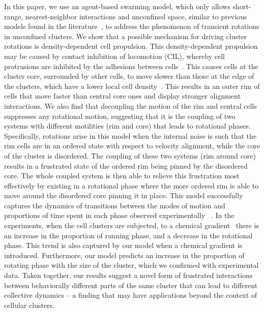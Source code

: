 \documentclass{article}
\begin{document}
In this paper, we use an agent-based swarming model, which only allows short-range, nearest-neighbor interactions and unconfined space, similar to previous models found in the literature~\cite{Couzin2005,Belmonte2008,Copenhagen2016a}, to address the phenomenon of transient rotations in unconfined clusters. We show that a possible mechanism for driving cluster rotations is density-dependent cell propulsion.  This density-dependent propulsion may be caused by contact inhibition of locomotion (CIL), whereby cell protrusions are inhibited by the adhesions between cells~\cite{Zimmermann2016,Camley2016}. This causes cells at the cluster core, surrounded by other cells, to move slower than those at the edge of the clusters, which have a lower local cell density~\cite{Tarle2015}. This results in an outer rim of cells that move faster than central core ones and display stronger alignment interactions. We also find that decoupling the motion of the rim and central cells suppresses any rotational motion, suggesting that it is the coupling of two systems with different motilities (rim and core) that leads to rotational phases. Specifically, rotations arise in this model when the internal noise is such that the rim cells are in an ordered state with respect to velocity alignment, while the core of the cluster is disordered. The coupling of these two systems (rim around core) results in a frustrated state of the ordered rim being pinned by the disordered core. The whole coupled system is then able to relieve this frustration most effectively by existing in a rotational phase where the more ordered rim is able to move around the disordered core pinning it in place. This model successfully captures the dynamics of transitions between the modes of motion and proportions of time spent in each phase observed experimentally ~\cite{Malet-Engra2014}.  In the experiments, when the cell clusters are subjected, to a chemical gradient~\cite{Mittal2003,Rappel2016} there is an increase in the proportion of running phase, and a decrease in the rotational phase. This trend is also captured by our model when a chemical gradient is introduced. Furthermore, our model predicts an increase in the proportion of rotating phase with the size of the cluster, which we confirmed with experimental data. Taken together, our results suggest a novel form of frustrated interactions between behaviorally different parts of the same cluster that can lead to different collective dynamics -- a finding that may have applications beyond the context of cellular clusters.
\end{document}
